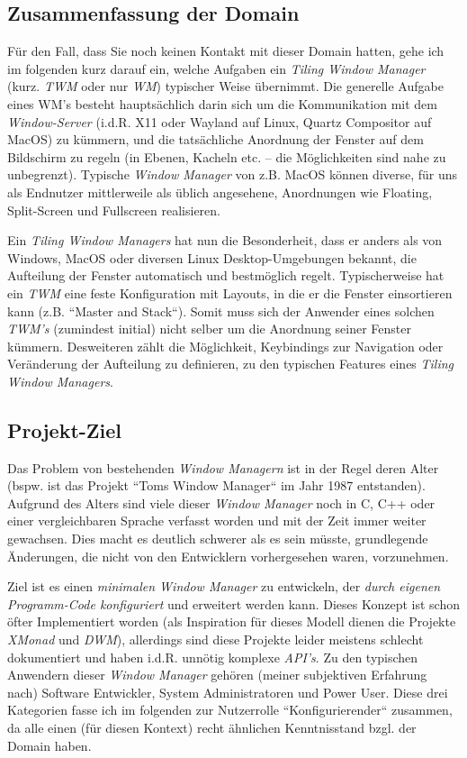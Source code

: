 \documentclass{article}
\begin{document}
\subsection{Zusammenfassung der Domain}

Für den Fall, dass Sie noch keinen Kontakt mit dieser Domain hatten, gehe ich im folgenden kurz darauf ein,
welche Aufgaben ein \emph{Tiling Window Manager} (kurz. \emph{TWM} oder nur \emph{WM}) typischer Weise
übernimmt. Die generelle Aufgabe eines WM's besteht hauptsächlich darin sich um die Kommunikation mit dem
\emph{Window-Server} (i.d.R. X11 oder Wayland auf Linux, Quartz Compositor auf MacOS) zu kümmern, und die
tatsächliche Anordnung der Fenster auf dem Bildschirm zu regeln (in Ebenen, Kacheln etc. – die Möglichkeiten
sind nahe zu unbegrenzt). Typische \emph{Window Manager} von z.B. MacOS können diverse, für uns als Endnutzer
mittlerweile als üblich angesehene, Anordnungen wie Floating, Split-Screen und Fullscreen realisieren. \par
Ein \emph{Tiling Window Managers} hat nun die Besonderheit, dass er anders als von Windows, MacOS oder diversen
Linux Desktop-Umgebungen bekannt, die Aufteilung der Fenster automatisch und bestmöglich regelt. Typischerweise
hat ein \emph{TWM} eine feste Konfiguration mit Layouts, in die er die Fenster einsortieren kann (z.B. ``Master
and Stack``). Somit muss sich der Anwender eines solchen \emph{TWM's} (zumindest initial) nicht selber um die
Anordnung seiner Fenster kümmern. Desweiteren zählt die Möglichkeit, Keybindings zur Navigation oder Veränderung
der Aufteilung zu definieren, zu den typischen Features eines \emph{Tiling Window Managers}.

\subsection{Projekt-Ziel}

Das Problem von bestehenden \emph{Window Managern} ist in der Regel deren Alter (bspw. ist das Projekt ``Toms
Window Manager`` im Jahr 1987 entstanden). Aufgrund des Alters sind viele dieser \emph{Window Manager} noch in
C, C++ oder einer vergleichbaren Sprache verfasst worden und mit der Zeit immer weiter gewachsen. Dies macht es
deutlich schwerer als es sein müsste, grundlegende Änderungen, die nicht von den Entwicklern vorhergesehen waren,
vorzunehmen. \par
Ziel ist es einen \emph{minimalen Window Manager} zu entwickeln, der \emph{durch eigenen Programm-Code konfiguriert}
und erweitert werden kann. Dieses Konzept ist schon öfter Implementiert worden (als Inspiration für dieses Modell
dienen die Projekte \emph{XMonad\footnotemark} und \emph{DWM\footnotemark}), allerdings sind diese Projekte leider
meistens schlecht dokumentiert und haben i.d.R. unnötig komplexe \emph{API's}. Zu den typischen Anwendern dieser
\emph{Window Manager} gehören (meiner subjektiven Erfahrung nach) Software Entwickler, System Administratoren und
Power User. Diese drei Kategorien fasse ich im folgenden zur Nutzerrolle ``Konfigurierender`` zusammen, da alle
einen (für diesen Kontext) recht ähnlichen Kenntnisstand bzgl. der Domain haben.
\end{document}
